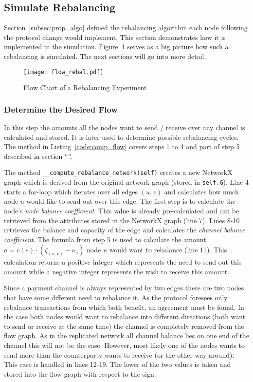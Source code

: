 \documentclass[final]{fhnwreport}       %
\begin{document}
\subsection{Simulate Rebalancing}\label{subsec:sim_rebal}
Section~\ref{subsec:prop_algo} defined the rebalancing algorithm each node following the protocol change would implement. This section demonstrates how it is implemented in the simulation. Figure~\ref{fig:flow_rebal} serves as a big picture how such a rebalancing is simulated. The next sections will go into more detail. 

\begin{figure}[H]
\centering
\texttt{[image: flow\_rebal.pdf]}
\caption{Flow Chart of a Rebalancing Experiment}
\label{fig:flow_rebal}
\end{figure}

\subsubsection{Determine the Desired Flow}\label{subsub:flow}
In this step the amounts all the nodes want to send / receive over any channel is calculated and stored. It is later used to determine possible rebalancing cycles. The method in Listing~\ref{code:comp_flow} covers steps 1 to 4 and part of step 5 described in section ``''.

The method \texttt{__compute_rebalance_network(self)} creates a new NetworkX graph which is derived from the original network graph (stored in \texttt{self.G}). Line 4 starts a for-loop which iterates over all edges $(u, v)$ and calculates how much node $u$ would like to send out over this edge. The first step is to calculate the node's \emph{node balance coefficient}. This value is already pre-calculated and can be retrieved from the attributes stored in the NetworkX graph (line 7). Lines 8-10 retrieves the balance and capacity of the edge and calculates the \emph{channel balance coefficient}. The formula from step 5 is used to calculate the amount $a = c(e)\cdot (\zeta_{(u,v)}-\nu_u)$ node $u$ would want to rebalance (line 11). This calculation returns a positive integer which represents the need to send out this amount while a negative integer represents the wish to receive this amount. 

Since a payment channel is always represented by two edges there are two nodes that have some different need to rebalance it. As the protocol foresees only rebalance transactions from which both benefit, an agreement must be found. In the case both nodes would want to rebalance into different directions (both want to send or receive at the same time) the channel is completely removed from the flow graph. As in the replicated network all channel balance lies on one end of the channel this will not be the case. However, most likely one of the nodes wants to send more than the counterparty wants to receive (or the other way around). This case is handled in lines 12-19. The lower of the two values is taken and stored into the flow graph with respect to the sign.
\end{document}
